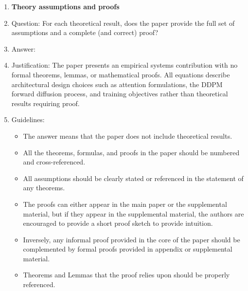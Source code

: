 \begin{enumerate}
\begin{itemize}
        \item The authors should discuss the computational efficiency of the proposed algorithms and how they scale with dataset size.
        \item If applicable, the authors should discuss possible limitations of their approach to address problems of privacy and fairness.
        \item While the authors might fear that complete honesty about limitations might be used by reviewers as grounds for rejection, a worse outcome might be that reviewers discover limitations that aren't acknowledged in the paper. The authors should use their best judgment and recognize that individual actions in favor of transparency play an important role in developing norms that preserve the integrity of the community. Reviewers will be specifically instructed to not penalize honesty concerning limitations.
    \end{itemize}

\item {\bf Theory assumptions and proofs}
    \item[] Question: For each theoretical result, does the paper provide the full set of assumptions and a complete (and correct) proof?
    \item[] Answer: \answerNA{}
    \item[] Justification: The paper presents an empirical systems contribution with no formal theorems, lemmas, or mathematical proofs. All equations describe architectural design choices such as attention formulations, the DDPM forward diffusion process, and training objectives rather than theoretical results requiring proof.
    \item[] Guidelines:
    \begin{itemize}
        \item The answer \answerNA{} means that the paper does not include theoretical results.
        \item All the theorems, formulas, and proofs in the paper should be numbered and cross-referenced.
        \item All assumptions should be clearly stated or referenced in the statement of any theorems.
        \item The proofs can either appear in the main paper or the supplemental material, but if they appear in the supplemental material, the authors are encouraged to provide a short proof sketch to provide intuition.
        \item Inversely, any informal proof provided in the core of the paper should be complemented by formal proofs provided in appendix or supplemental material.
        \item Theorems and Lemmas that the proof relies upon should be properly referenced.
    \end{itemize}


\end{enumerate}
